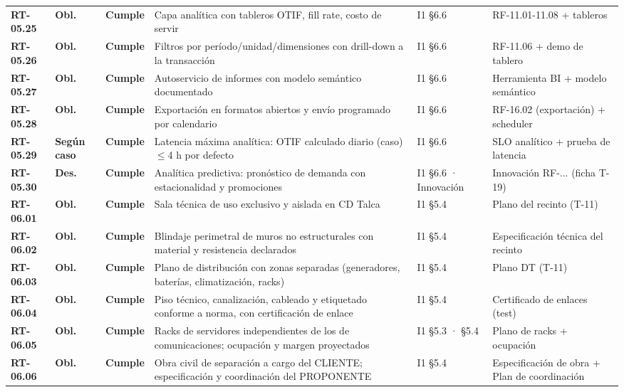 \begin{small}
\begin{longtable}{@{}p{1.35cm} p{1.15cm} p{1.15cm} p{4.6cm} p{2.35cm} p{3.8cm}@{}}
\textbf{RT-05.25} & \textbf{Obl.} & \textbf{Cumple} & Capa anal\'itica con tableros OTIF, fill rate, costo de servir & I1 §6.6 & RF-11.01-11.08 + tableros \\
\textbf{RT-05.26} & \textbf{Obl.} & \textbf{Cumple} & Filtros por per\'iodo/unidad/dimensiones con drill-down a la transacci\'on & I1 §6.6 & RF-11.06 + demo de tablero \\
\textbf{RT-05.27} & \textbf{Obl.} & \textbf{Cumple} & Autoservicio de informes con modelo sem\'antico documentado & I1 §6.6 & Herramienta BI + modelo sem\'antico \\
\textbf{RT-05.28} & \textbf{Obl.} & \textbf{Cumple} & Exportaci\'on en formatos abiertos y env\'io programado por calendario & I1 §6.6 & RF-16.02 (exportaci\'on) + scheduler \\
\textbf{RT-05.29} & \textbf{Según caso} & \textbf{Cumple} & Latencia m\'axima anal\'itica: OTIF calculado diario (caso) $\leq$4 h por defecto & I1 §6.6 & SLO anal\'itico + prueba de latencia \\
\textbf{RT-05.30} & \textbf{Des.} & \textbf{Cumple} & Anal\'itica predictiva: pron\'ostico de demanda con estacionalidad y promociones & I1 §6.6 · Innovaci\'on & Innovaci\'on RF-... (ficha T-19) \\
\textbf{RT-06.01} & \textbf{Obl.} & \textbf{Cumple} & Sala t\'ecnica de uso exclusivo y aislada en CD Talca & I1 §5.4 & Plano del recinto (T-11) \\
\textbf{RT-06.02} & \textbf{Obl.} & \textbf{Cumple} & Blindaje perimetral de muros no estructurales con material y resistencia declarados & I1 §5.4 & Especificaci\'on t\'ecnica del recinto \\
\textbf{RT-06.03} & \textbf{Obl.} & \textbf{Cumple} & Plano de distribuci\'on con zonas separadas (generadores, bater\'ias, climatizaci\'on, racks) & I1 §5.4 & Plano DT (T-11) \\
\textbf{RT-06.04} & \textbf{Obl.} & \textbf{Cumple} & Piso t\'ecnico, canalizaci\'on, cableado y etiquetado conforme a norma, con certificaci\'on de enlace & I1 §5.4 & Certificado de enlaces (test) \\
\textbf{RT-06.05} & \textbf{Obl.} & \textbf{Cumple} & Racks de servidores independientes de los de comunicaciones; ocupaci\'on y margen proyectados & I1 §5.3 · §5.4 & Plano de racks + ocupaci\'on \\
\textbf{RT-06.06} & \textbf{Obl.} & \textbf{Cumple} & Obra civil de separaci\'on a cargo del CLIENTE; especificaci\'on y coordinaci\'on del PROPONENTE & I1 §5.4 & Especificaci\'on de obra + Plan de coordinaci\'on \\

\end{longtable}
\end{small}

